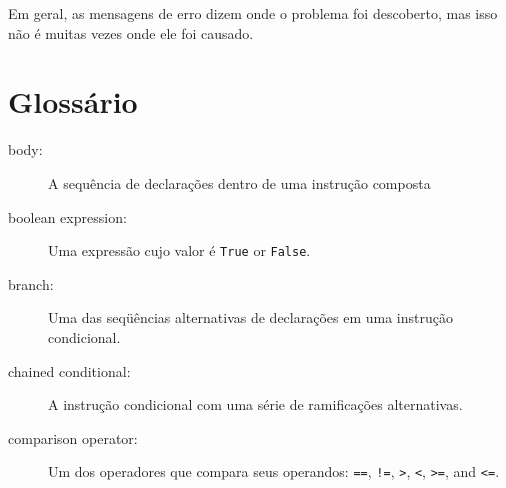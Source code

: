 {%


Em geral, as mensagens de erro dizem onde o problema foi descoberto,
mas isso não é muitas vezes onde ele foi causado.



\section{Glossário}

\begin{description}


\item[body:] A sequência de declarações dentro de uma instrução composta

\item[boolean expression:] Uma expressão cujo valor é
{\tt True} or {\tt False}.

\item[branch:] Uma das seqüências alternativas de declarações em uma 
instrução condicional.

\item[chained conditional:]  A instrução condicional com uma série 
de ramificações alternativas.

\item[comparison operator:] Um dos operadores que compara 
seus operandos: {\tt ==}, {\tt !=}, {\tt >}, {\tt <}, {\tt >=}, and {\tt <=}.


\end{description}}
